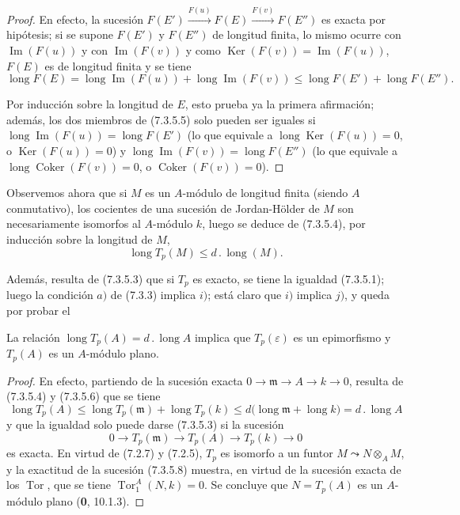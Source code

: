 \begin{proof}
En efecto, la sucesión
$F(E')\xrightarrow{F(u)}F(E)\xrightarrow{F(v)}F(E'')$
es exacta por hipótesis; si se supone $F(E')$ y $F(E'')$ de longitud
finita, lo mismo ocurre con $\operatorname{Im}(F(u))$ y con
$\operatorname{Im}(F(v))$ y como
$\operatorname{Ker}(F(v))=\operatorname{Im}(F(u))$, $F(E)$ es de longitud
finita y se tiene
\[
  \operatorname{long}F(E)
  =
  \operatorname{long}\operatorname{Im}(F(u))
  +
  \operatorname{long}\operatorname{Im}(F(v))
  \leq
  \operatorname{long}F(E')+\operatorname{long}F(E'').
  \tag{7.3.5.5}\label{III.7.3.5.5.fr}
\]

Por inducción sobre la longitud de $E$, esto prueba ya la primera afirmación;
además, los dos miembros de (7.3.5.5) solo pueden ser iguales si
$\operatorname{long}\operatorname{Im}(F(u))=\operatorname{long}F(E')$
(lo que equivale a
$\operatorname{long}\operatorname{Ker}(F(u))=0$, o
$\operatorname{Ker}(F(u))=0$) y
$\operatorname{long}\operatorname{Im}(F(v))=\operatorname{long}F(E'')$
(lo que equivale a
$\operatorname{long}\operatorname{Coker}(F(v))=0$, o
$\operatorname{Coker}(F(v))=0$).
\end{proof}

Observemos ahora que si $M$ es un $A$-módulo de longitud finita (siendo $A$
conmutativo), los cocientes de una sucesión de Jordan-Hölder de $M$ son
necesariamente isomorfos al $A$-módulo $k$, luego se deduce de (7.3.5.4), por
inducción sobre la longitud de $M$,
\[
  \operatorname{long}T_p(M)\leq d\mathbin{.}\operatorname{long}(M).
  \tag{7.3.5.6}\label{III.7.3.5.6.fr}
\]

Además, resulta de (7.3.5.3) que si $T_p$ es exacto, se tiene la igualdad
(7.3.5.1); luego la condición $a)$ de (7.3.3) implica $i)$; está claro que
$i)$ implica $j)$, y queda por probar el

\begin{lemma}[7.3.5.7]
La relación
$\operatorname{long}T_p(A)=d\mathbin{.}\operatorname{long}A$
implica que $T_p(\varepsilon)$ es un epimorfismo y $T_p(A)$ es un
$A$-módulo plano.
\end{lemma}

\begin{proof}
En efecto, partiendo de la sucesión exacta
$0\longrightarrow\mathfrak m\longrightarrow A\longrightarrow k\longrightarrow0$,
resulta de (7.3.5.4) y (7.3.5.6) que se tiene
\[
  \operatorname{long}T_p(A)
  \leq
  \operatorname{long}T_p(\mathfrak m)+\operatorname{long}T_p(k)
  \leq
  d\bigl(\operatorname{long}\mathfrak m+\operatorname{long}k\bigr)
  =d\mathbin{.}\operatorname{long}A
\]
y que la igualdad solo puede darse (7.3.5.3) si la sucesión
\[
  0\longrightarrow T_p(\mathfrak m)\longrightarrow T_p(A)
  \longrightarrow T_p(k)\longrightarrow0
  \tag{7.3.5.8}\label{III.7.3.5.8.fr}
\]
es exacta. En virtud de (7.2.7) y (7.2.5), $T_p$ es isomorfo a un funtor
$M\leadsto N\otimes_A M$, y la exactitud de la sucesión (7.3.5.8) muestra, en virtud
de la sucesión exacta de los $\operatorname{Tor}$, que se tiene
$\operatorname{Tor}_1^A(N,k)=0$. Se concluye que $N=T_p(A)$ es un
$A$-módulo plano (\textbf{0}, 10.1.3).
\end{proof}

